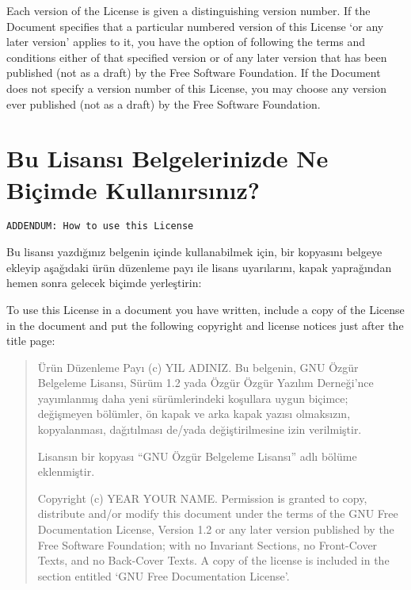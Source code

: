 \begin{multicols}{2}
\begin{ingliz}Each version of the License is given a distinguishing
version number.  If the Document specifies that a particular
numbered version of this License `or any later version'
applies to it, you have the option of
following the terms and conditions either of that specified
version or of any later version that has been published (not
as a draft) by the Free Software Foundation.  If the Document
does not specify a version number of this License, you may
choose any version ever published (not as a draft) by the Free
Software Foundation.\end{ingliz}

\section{Bu Lisansı Belgelerinizde Ne Biçimde Kullanırsınız?}\hfill\begin{verbatim}ADDENDUM: How to use this License
\end{verbatim}\label{gfdl-addendum} %

Bu lisansı yazdığınız belgenin içinde kullanabilmek için, bir kopyasını belgeye ekleyip  aşağıdaki ürün düzenleme payı ile lisans uyarılarını, kapak yaprağından hemen sonra gelecek biçimde yerleştirin:

\begin{ingliz}To use this License in a document you have written,
include a copy of the License in the document and put the
following copyright and license notices just after the title
page:\end{ingliz}

\begin{quotation}\small\begingroup 

Ürün Düzenleme Payı (c)  YIL  ADINIZ.
Bu belgenin, GNU Özgür Belgeleme Lisansı, Sürüm 1.2 yada Özgür
Özgür Yazılım Derneği'nce yayımlanmış daha yeni sürümlerindeki koşullara uygun biçimce; değişmeyen bölümler, ön kapak ve arka kapak yazısı olmaksızın, kopyalanması, dağıtılması de/yada değiştirilmesine izin verilmiştir.

Lisansın bir kopyası “GNU Özgür Belgeleme Lisansı” adlı bölüme eklenmiştir.

\begin{ingliz}Copyright (c)  YEAR  YOUR NAME. Permission is granted to
copy, distribute and/or modify this document under the terms
of the GNU Free Documentation License, Version 1.2 or any
later version published by the Free Software Foundation;
with no Invariant Sections, no Front-Cover Texts, and no
Back-Cover Texts. A copy of the license is included in the
section entitled `GNU Free Documentation License'.\end{ingliz}


\end{quotation}
\end{multicols}

